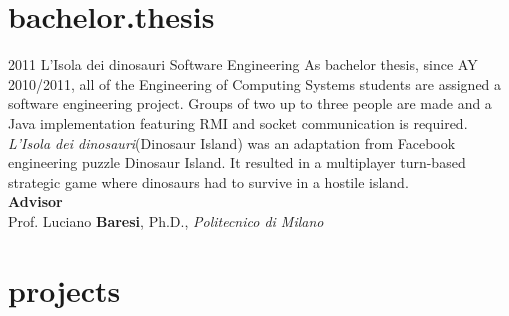 \documentclass[]{friggeri-cv} %
\begin{document}
\section{bachelor.thesis}

\begin{entrylist}
\entry
{2011}
{L'Isola dei dinosauri}
{Software Engineering}
{As bachelor thesis, since AY 2010/2011, all of the Engineering of Computing Systems students are assigned a software engineering project. Groups of two up to three people are
made and a Java implementation featuring RMI and socket communication is required. \emph{L'Isola
dei dinosauri}(Dinosaur Island) was an adaptation from Facebook engineering puzzle Dinosaur
Island. It resulted in a multiplayer turn-based strategic game where dinosaurs had to survive in a
hostile island. \\

\textbf{Advisor} \\
Prof. Luciano \textbf{Baresi}, Ph.D., \emph{Politecnico di Milano}}
\end{entrylist}

\section{projects}
\end{document}
